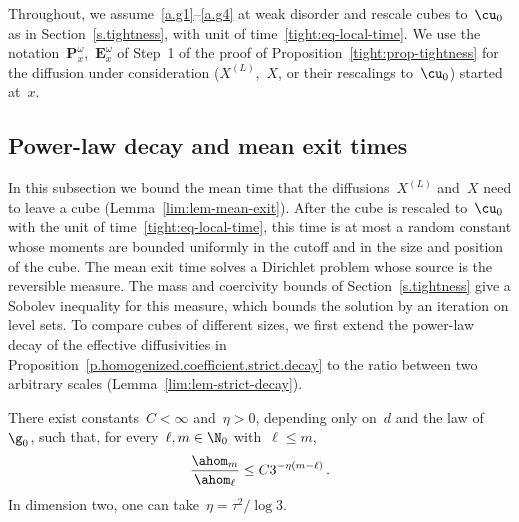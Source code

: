 \documentclass[11pt]{amsart}
\begin{document}
Throughout, we assume~\ref{a.g1}--\ref{a.g4} at weak disorder and rescale cubes to~$\cu_0$ as in Section~\ref{s.tightness}, with unit of time~\eqref{tight:eq-local-time}. We use the notation~$\mathbf P_x^\omega$,~$\mathbf E_x^\omega$ of Step~1 of the proof of Proposition~\ref{tight:prop-tightness} for the diffusion under consideration ($X^{(L)}$,~$X$, or their rescalings to~$\cu_0$) started at~$x$.

\subsection{Power-law decay and mean exit times}
\label{lim:sec-exit}

In this subsection we bound the mean time that the diffusions~$X^{(L)}$ and~$X$ need to leave a cube (Lemma~\ref{lim:lem-mean-exit}). After the cube is rescaled to~$\cu_0$ with the unit of time~\eqref{tight:eq-local-time}, this time is at most a random constant whose moments are bounded uniformly in the cutoff and in the size and position of the cube. The mean exit time solves a Dirichlet problem whose source is the reversible measure. The mass and coercivity bounds of Section~\ref{s.tightness} give a Sobolev inequality for this measure, which bounds the solution by an iteration on level sets. To compare cubes of different sizes, we first extend the power-law decay of the effective diffusivities in Proposition~\ref{p.homogenized.coefficient.strict.decay} to the ratio between two arbitrary scales (Lemma~\ref{lim:lem-strict-decay}).

\begin{lemma}
\label{lim:lem-strict-decay}
There exist constants~$C<\infty$ and~$\eta>0$, depending only on~$d$ and the law of~$\g_0$, such that, for every~$\ell,m\in\N_0$ with~$\ell\leq m$,
\begin{equation}
	\frac{\ahom_m}{\ahom_\ell}\leq C3^{-\eta(m-\ell)}\,.
	\label{lim:eq-strict-decay}
\end{equation}
In dimension two, one can take~$\eta=\tau^2/\log3$.
\end{lemma}
\end{document}
